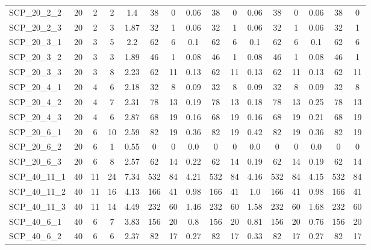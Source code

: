\begin{sidewaystable}[!ht]
{\begin{tabular}{lccccccccccccccc}
SCP\_20\_2\_2 & 20 & 2 & 2 & 1.4 & 38 & 0 &  \textcolor{blue2}{0.06} & 38 & 0 &  \textcolor{blue2}{0.06} & 38 & 0 &  \textcolor{blue2}{0.06} & 38 & 0 \\
SCP\_20\_2\_3 & 20 & 2 & 3 & 1.87 & 32 & 1 &  \textcolor{blue2}{0.06} & 32 & 1 &  \textcolor{blue2}{0.06} & 32 & 1 &  \textcolor{blue2}{0.06} & 32 & 1 \\
SCP\_20\_3\_1 & 20 & 3 & 5 & 2.2 & 62 & 6 &  \textcolor{blue2}{0.1} & 62 & 6 &  \textcolor{blue2}{0.1} & 62 & 6 &  \textcolor{blue2}{0.1} & 62 & 6 \\
SCP\_20\_3\_2 & 20 & 3 & 3 & 1.89 & 46 & 1 &  \textcolor{blue2}{0.08} & 46 & 1 &  \textcolor{blue2}{0.08} & 46 & 1 &  \textcolor{blue2}{0.08} & 46 & 1 \\
SCP\_20\_3\_3 & 20 & 3 & 8 & 2.23 & 62 & 11 &  \textcolor{blue2}{0.13} & 62 & 11 &  \textcolor{blue2}{0.13} & 62 & 11 &  \textcolor{blue2}{0.13} & 62 & 11 \\
SCP\_20\_4\_1 & 20 & 4 & 6 & 2.18 & 32 & 8 &  \textcolor{blue2}{0.09} & 32 & 8 &  \textcolor{blue2}{0.09} & 32 & 8 &  \textcolor{blue2}{0.09} & 32 & 8 \\
SCP\_20\_4\_2 & 20 & 4 & 7 & 2.31 & 78 & 13 & 0.19 & 78 & 13 &  \textcolor{blue2}{0.18} & 78 & 13 & 0.25 & 78 & 13 \\
SCP\_20\_4\_3 & 20 & 4 & 6 & 2.87 & 68 & 19 & 0.16 & 68 & 19 & 0.16 & 68 & 19 & 0.21 & 68 & 19 \\
SCP\_20\_6\_1 & 20 & 6 & 10 & 2.59 & 82 & 19 & 0.36 & 82 & 19 & 0.42 & 82 & 19 & 0.36 & 82 & 19 \\
SCP\_20\_6\_2 & 20 & 6 & 1 & 0.55 & 0 & 0 &  \textcolor{blue2}{0.0} & 0 & 0 &  \textcolor{blue2}{0.0} & 0 & 0 &  \textcolor{blue2}{0.0} & 0 & 0 \\
SCP\_20\_6\_3 & 20 & 6 & 8 & 2.57 & 62 & 14 & 0.22 & 62 & 14 & 0.19 & 62 & 14 & 0.19 & 62 & 14 \\
SCP\_40\_11\_1 & 40 & 11 & 24 & 7.34 & 532 & 84 & 4.21 & 532 & 84 & 4.16 & 532 & 84 & 4.15 & 532 & 84 \\
SCP\_40\_11\_2 & 40 & 11 & 16 & 4.13 & 166 & 41 & 0.98 & 166 & 41 & 1.0 & 166 & 41 & 0.98 & 166 & 41 \\
SCP\_40\_11\_3 & 40 & 11 & 14 & 4.49 & 232 & 60 &  \textcolor{blue2}{1.46} & 232 & 60 & 1.58 & 232 & 60 & 1.68 & 232 & 60 \\
SCP\_40\_6\_1 & 40 & 6 & 7 & 3.83 & 156 & 20 & 0.8 & 156 & 20 & 0.81 & 156 & 20 &  \textcolor{blue2}{0.76} & 156 & 20 \\
SCP\_40\_6\_2 & 40 & 6 & 6 & 2.37 & 82 & 17 & 0.27 & 82 & 17 & 0.33 & 82 & 17 & 0.27 & 82 & 17 \\

\end{tabular}}
\end{sidewaystable}
